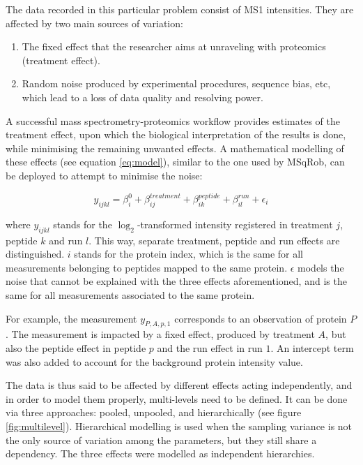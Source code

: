 The data recorded in this particular problem consist of \ac{MS1} intensities. They are affected by two main sources of variation:

\begin{enumerate}
\item The fixed effect that the researcher aims at unraveling with proteomics (treatment effect).
\item Random noise produced by experimental procedures, sequence bias, etc, which lead to a loss of data quality and resolving power.
\end{enumerate}


A successful mass spectrometry-proteomics workflow  provides estimates of the treatment effect, upon which the biological interpretation of the results is done, while minimising the remaining unwanted effects. A mathematical modelling of these effects (see equation \ref{eq:model}), similar to the one used by MSqRob, can be deployed to attempt to minimise the noise:

\begin{equation}\label{eq:model}
y_{ijkl} = \beta_{i}^{0} + \beta_{ij}^{treatment} + \beta_{ik}^{peptide} + \beta_{il}^{run} + \epsilon_{i}
\end{equation}

where $y_{ijkl}$ stands for the $\log_2$-transformed intensity registered in treatment $j$, peptide $k$ and run $l$. This way, separate treatment, peptide and run effects are distinguished. $i$ stands for the protein index, which is the same for all measurements belonging to peptides mapped to the same protein. $\epsilon$ models the noise that cannot be explained with the three effects aforementioned, and is the same for all measurements associated to the same protein.

For example, the measurement $y_{P,A,p,1}$ corresponds to an observation of protein $P$. The measurement is impacted by a fixed effect, produced by treatment $A$, but also the peptide effect in peptide $p$ and the run effect in run $1$. An intercept term was also added to account for the background protein intensity value.

The data is thus said to be affected by different effects acting independently, and in order to model them properly, multi-levels need to be defined. It can be done via three approaches: pooled, unpooled, and hierarchically (see figure \ref{fig:multilevel}). Hierarchical modelling is used when the sampling variance is not the only source of variation among the parameters, but they still share a dependency. The three effects were modelled as independent hierarchies.

